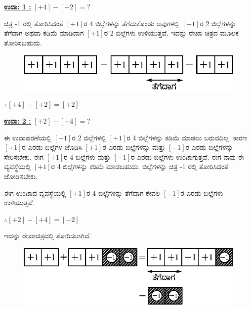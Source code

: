 \noindent
{\textbf{\underline{ಉದಾ: 1 :}}} $[+4] - [+2] = ?$

ಚಿತ್ರ -1 ರಲ್ಲಿ ತೋರಿಸಿದಂತೆ $[+1]$ರ 4 ಬಿಲ್ಲೆಗಳನ್ನು ತೆಗೆದುಕೊಂಡು ಅವುಗಳಲ್ಲಿ $[+1]$ರ 2 ಬಿಲ್ಲೆಗಳನ್ನು ತೆಗೆದಾಗ ಅಥವಾ ಕಡಿಮೆ ಮಾಡಿದಾಗ $[+1]$ರ 2 ಬಿಲ್ಲೆಗಳು ಉಳಿಯುತ್ತವೆ. ಇದನ್ನು  ರೇಖಾ ಚಿತ್ರದ ಮೂಲಕ ತೋರಿಸಬಹುದು.
\begin{figure}[H]
\centering
\includegraphics{src/figure/chap3/fig3-12b.eps}
\end{figure}

$\therefore [+4] - [+2] = [+2]$

\noindent
{\textbf{\underline{ಉದಾ: 2 :}}} $[+2] - [+4] = ?$

ಈ ಉದಾಹರಣೆಯಲ್ಲಿ $[+1]$ರ 2 ಬಿಲ್ಲೆಗಳಲ್ಲಿ $[+1]$ರ 4 ಬಿಲ್ಲೆಗಳನ್ನು ಕಡಿಮೆ ಮಾಡಲು ಬರುವದಿಲ್ಲ. ಕಾರಣ $[+1]$ರ ಎರಡು ಬಿಲ್ಲೆಗಳ ಜೊಡಿಸಿ $[+1]$ರ ಎರಡು ಬಿಲ್ಲೆಗಳನ್ನು ಮತ್ತು $[-1]$ರ ಎರಡು ಬಿಲ್ಲೆಗಳನ್ನು ಸೇರಿಸಬೇಕು. ಈಗ $[+1]$ರ 4 ಬಿಲ್ಲೆಗಳು ಮತ್ತು $[-1]$ರ ಎರಡು ಬಿಲ್ಲೆಗಳು ಉಂಟಾಗುತ್ತವೆ. ಈಗ ನಾವು ಈ ವ್ಯವಸ್ಥೆಯಲ್ಲಿ $[+1]$ರ 4 ಬಿಲ್ಲೆಗಳನ್ನು ಕಡಿಮೆ ಮಾಡಬಹುದು. ಬಿಲ್ಲೆಗಳನ್ನು ಚಿತ್ರ -1 ರಲ್ಲಿ ತೋರಿಸಿದಂತೆ ಜೋಡಿಸಬೇಕು. 

ಈಗ ಉಂಟಾದ ವ್ಯವಸ್ಥೆಯಲ್ಲಿ $[+1]$ರ 4 ಬಿಲ್ಲೆಗಳನ್ನು ತೆಗೆದಾಗ ಕೇವಲ $[-1]$ರ ಎರಡು ಬಿಲ್ಲೆಗಳು ಉಳಿಯುತ್ತವೆ.

$\therefore [+2] - [+4] = [-2]$

\eject

ಇದನ್ನು  ರೇಖಾಚಿತ್ರದಲ್ಲಿ ತೋರಿಸಲಾಗಿದೆ. 
\begin{figure}[H]
\centering
\includegraphics[scale=0.8]{src/figure/chap3/fig3-13b.eps}
\end{figure}

